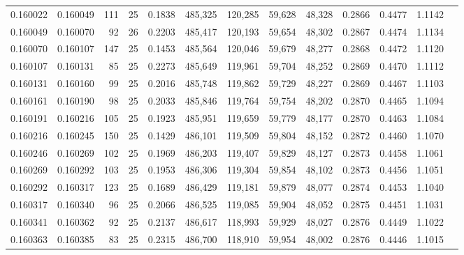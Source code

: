 \begin{tabular}{rrrrrrrrrrrrr}
0.160022 & 0.160049 &   111 &  25 &                                     0.1838 & 485,325 & 120,285 &  59,628 &  48,328 & 0.2866 & 0.4477 & 1.1142 \\
0.160049 & 0.160070 &    92 &  26 &                                     0.2203 & 485,417 & 120,193 &  59,654 &  48,302 & 0.2867 & 0.4474 & 1.1134 \\
0.160070 & 0.160107 &   147 &  25 &                                     0.1453 & 485,564 & 120,046 &  59,679 &  48,277 & 0.2868 & 0.4472 & 1.1120 \\
0.160107 & 0.160131 &    85 &  25 &                                     0.2273 & 485,649 & 119,961 &  59,704 &  48,252 & 0.2869 & 0.4470 & 1.1112 \\
0.160131 & 0.160160 &    99 &  25 &                                     0.2016 & 485,748 & 119,862 &  59,729 &  48,227 & 0.2869 & 0.4467 & 1.1103 \\
0.160161 & 0.160190 &    98 &  25 &                                     0.2033 & 485,846 & 119,764 &  59,754 &  48,202 & 0.2870 & 0.4465 & 1.1094 \\
0.160191 & 0.160216 &   105 &  25 &                                     0.1923 & 485,951 & 119,659 &  59,779 &  48,177 & 0.2870 & 0.4463 & 1.1084 \\
0.160216 & 0.160245 &   150 &  25 &                                     0.1429 & 486,101 & 119,509 &  59,804 &  48,152 & 0.2872 & 0.4460 & 1.1070 \\
0.160246 & 0.160269 &   102 &  25 &                                     0.1969 & 486,203 & 119,407 &  59,829 &  48,127 & 0.2873 & 0.4458 & 1.1061 \\
0.160269 & 0.160292 &   103 &  25 &                                     0.1953 & 486,306 & 119,304 &  59,854 &  48,102 & 0.2873 & 0.4456 & 1.1051 \\
0.160292 & 0.160317 &   123 &  25 &                                     0.1689 & 486,429 & 119,181 &  59,879 &  48,077 & 0.2874 & 0.4453 & 1.1040 \\
0.160317 & 0.160340 &    96 &  25 &                                     0.2066 & 486,525 & 119,085 &  59,904 &  48,052 & 0.2875 & 0.4451 & 1.1031 \\
0.160341 & 0.160362 &    92 &  25 &                                     0.2137 & 486,617 & 118,993 &  59,929 &  48,027 & 0.2876 & 0.4449 & 1.1022 \\
0.160363 & 0.160385 &    83 &  25 &                                     0.2315 & 486,700 & 118,910 &  59,954 &  48,002 & 0.2876 & 0.4446 & 1.1015 \\

\end{tabular}
